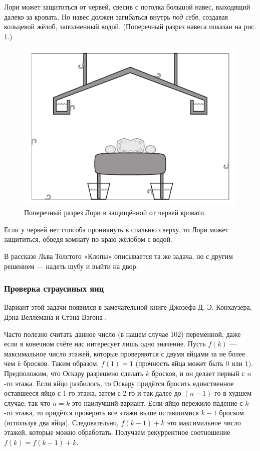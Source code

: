 Лори может защититься от червей, свесив с потолка большой навес, выходящий далеко за кровать.
Но навес должен загибаться внутрь \emph{под себя}, создавая кольцевой жёлоб, заполненный водой.
(Поперечный разрез навеса показан на рис. \ref{pic:chervi}.)

\begin{figure}[h!]
\centering
\includegraphics[scale=0.5]{pics/chervi}
\caption{Поперечный разрез Лори в защищённой от червей кровати.}
\label{pic:chervi}
\end{figure}

Если у червей нет способа проникнуть в спальню сверху, то Лори может защититься, обведя комнату по краю жёлобом с водой.

\begin{addedbytheeditors}
В рассказе Льва Толстого «Клопы» описывается та же задача, но с другим решением --- надеть шубу и выйти на двор.
\pr
\end{addedbytheeditors} 

\subsubsection*{Проверка страусиных яиц}

Вариант этой задачи появился в замечательной книге Джозефа Д. Э. Конхаузера, Дэна Веллемана и Стэна Вэгона \cite{42}.

Часто полезно считать данное число (в нашем случае 102) переменной, даже если в конечном счёте нас интересует лишь одно значение.
Пусть $f(k)$ --- максимальное число этажей, которые проверяются с двумя яйцами за не более чем $k$ бросков.
Таким образом, $f(1) = 1$ (прочность яйца может быть $0$ или $1$).
Предположим, что Оскару разрешено сделать $k$ бросков, и он делает первый с $n$-го этажа.
Если яйцо разбилось, то Оскару придётся бросить единственное оставшееся яйцо с 1-го этажа, затем с 2-го и так далее до $(n-1)$-го в худшем случае;
так что $n = k$ это наилучший вариант.
Если яйцо пережило падение с $k$-го этажа, то придётся проверить все этажи выше оставшимися $k-1$ броском (используя два яйца).
Следовательно, $f(k - 1) + k$ это максимальное число этажей, которые можно обработать.
Получаем рекуррентное соотношение $f(k) = f(k - 1) + k$.

